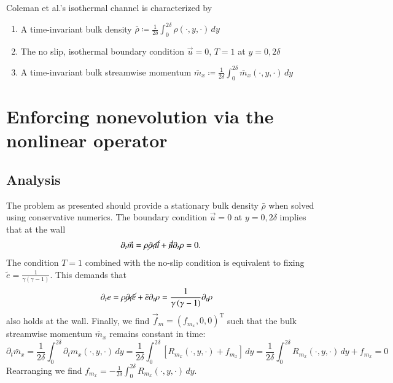 \documentclass[letterpaper,11pt,nointlimits,reqno]{amsart}
\begin{document}
Coleman et al.'s isothermal channel is characterized by
\begin{enumerate}
  \item A time-invariant bulk density $\bar{\rho} \coloneqq \frac{1}{2\delta}
        \int_{0}^{2\delta} \rho\!\left(\cdot,y,\cdot\right)\,dy $
  \item The no slip, isothermal boundary condition
        $\vec{u}=0$, $T = 1$ at $y = 0,2\delta$
  \item A time-invariant bulk streamwise momentum
        $\bar{m}_{x} \coloneqq \frac{1}{2\delta}
        \int_{0}^{2\delta} \bar{m}_{x}\!\left(\cdot,y,\cdot\right)\,dy $
\end{enumerate}


\section{Enforcing nonevolution via the nonlinear operator}

\subsection{Analysis}

The problem as presented should provide a stationary bulk density $\bar{\rho}$
when solved using conservative numerics.  The boundary condition $\vec{u} = 0$
at $y = 0,2\delta$ implies that at the wall
\begin{align}
  \partial_{t} \vec{m}
  =   \rho \cancel{\partial_{t} \vec{u}}
    + \cancel{\vec{u}} \partial_{t} \rho
  = 0.
\end{align}
The condition $T=1$ combined with the no-slip condition is equivalent to fixing
$\tilde{e}=\frac{1}{\gamma\left(\gamma-1\right)}$.  This demands that
\begin{align}
  \partial_{t} e
  &=  \rho \cancel{\partial_{t} \tilde{e}}
    + \tilde{e} \partial_{t} \rho
  = \frac{1}{\gamma\left(\gamma-1\right)} \partial_{t} \rho
\end{align}
also holds at the wall.  Finally, we find $\vec{f}_{m} =
\left(f_{m_x},0,0\right)^{\textrm{T}}$ such that the bulk streamwise momentum
$\bar{m}_{x}$ remains constant in time:
\begin{equation}
  \partial_{t} \bar{m}_x
   = \frac{1}{2\delta} \int_{0}^{2\delta}
     \partial_{t} m_{x} \!\left(\cdot,y,\cdot\right) \, dy
   = \frac{1}{2\delta} \int_{0}^{2\delta}
     \left[  R_{m_x}\!\left(\cdot,y,\cdot\right) + f_{m_x} \right] \, dy
   = \frac{1}{2\delta} \int_{0}^{2\delta}
     R_{m_x}\!\left(\cdot,y,\cdot\right) \, dy + f_{m_x}
   = 0
\end{equation}
Rearranging we find $f_{m_x} = - \frac{1}{2\delta}
\int_{0}^{2\delta} R_{m_x}\!\left(\cdot,y,\cdot\right) \, dy$.
\end{document}
